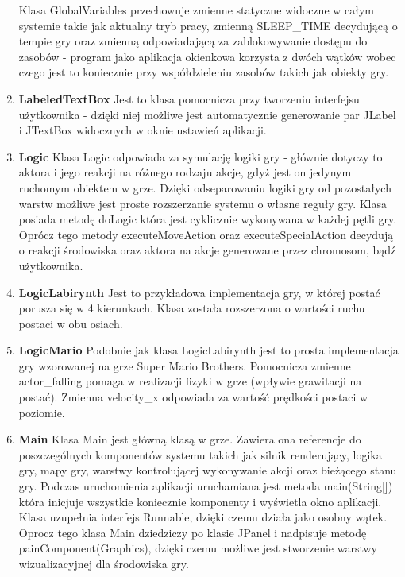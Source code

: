 \begin{par}
\begin{enumerate}
	Klasa GlobalVariables przechowuje zmienne statyczne widoczne w całym systemie takie jak aktualny tryb pracy, zmienną SLEEP\_TIME decydującą o tempie gry oraz zmienną odpowiadającą za zablokowywanie dostępu do zasobów - program jako aplikacja okienkowa korzysta z dwóch wątków wobec czego jest to koniecznie przy współdzieleniu zasobów takich jak obiekty gry.
	\item{\bf LabeledTextBox }\newline
	Jest to klasa pomocnicza przy tworzeniu interfejsu użytkownika - dzięki niej możliwe jest automatycznie generowanie par JLabel i JTextBox widocznych w oknie ustawień aplikacji.
	\item{\bf Logic }\newline
	Klasa Logic odpowiada za symulację logiki gry - głównie dotyczy to aktora i jego reakcji na różnego rodzaju akcje, gdyż jest on jedynym ruchomym obiektem w grze. Dzięki odseparowaniu logiki gry od pozostałych warstw możliwe jest proste rozszerzanie systemu o własne reguły gry. Klasa posiada metodę doLogic która jest cyklicznie wykonywana w każdej pętli gry. Oprócz tego metody executeMoveAction oraz executeSpecialAction decydują o reakcji środowiska oraz aktora na akcje generowane przez chromosom, bądź użytkownika.
	\item{\bf LogicLabirynth }\newline
	Jest to przykładowa implementacja gry, w której postać porusza się w 4 kierunkach. Klasa została rozszerzona o wartości ruchu postaci w obu osiach.
	\item{\bf LogicMario }\newline
	Podobnie jak klasa LogicLabirynth jest to prosta implementacja gry wzorowanej na grze Super Mario Brothers. Pomocnicza zmienne actor\_falling pomaga w realizacji fizyki w grze (wpływie grawitacji na postać). Zmienna velocity\_x odpowiada za wartość prędkości postaci w poziomie.
	\item{\bf Main }\newline
	Klasa Main jest główną klasą w grze. Zawiera ona referencje do poszczególnych komponentów systemu takich jak silnik renderujący, logika gry, mapy gry, warstwy kontrolującej wykonywanie akcji oraz bieżącego stanu gry.
	Podczas uruchomienia aplikacji uruchamiana jest metoda main(String[]) która inicjuje wszystkie koniecznie komponenty i wyświetla okno aplikacji.
	Klasa uzupełnia interfejs Runnable, dzięki czemu działa jako osobny wątek. Oprocz tego klasa Main dziedziczy po klasie JPanel i nadpisuje metodę painComponent(Graphics), dzięki czemu możliwe jest stworzenie warstwy wizualizacyjnej dla środowiska gry.

\end{enumerate}
\end{par}

